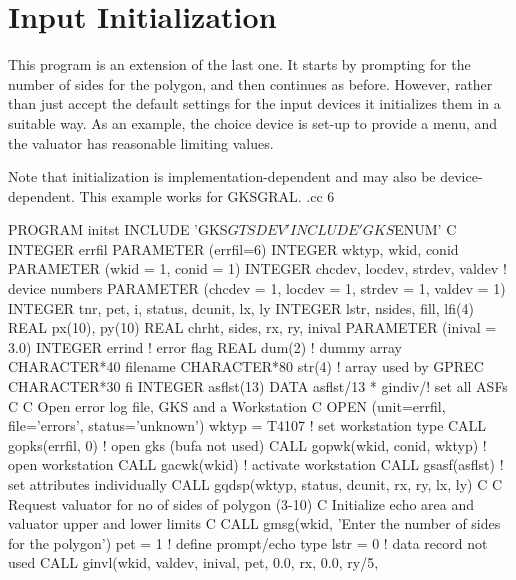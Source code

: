 \section{\protect\label{sec:iinput}Input Initialization}
 
This program is an extension of the last one.
It starts by prompting for the number of sides for the polygon,
and then continues as before. However, rather than just accept the default
settings for the input devices it initializes them in a suitable way.
As an example, the choice device is set-up to
provide a menu, and the valuator has reasonable limiting values.
 
Note that initialization is implementation-dependent and may also be
device-dependent. This example works for GKSGRAL.
.cc 6
\begin{XMP}
      PROGRAM initst
      INCLUDE  'GKS$GTSDEV'
      INCLUDE  'GKS$ENUM'
C
      INTEGER      errfil
      PARAMETER   (errfil=6)
      INTEGER      wktyp, wkid,  conid
      PARAMETER   (wkid = 1, conid = 1)
      INTEGER      chcdev, locdev, strdev, valdev  ! device numbers
      PARAMETER   (chcdev = 1, locdev = 1, strdev = 1, valdev = 1)
      INTEGER      tnr, pet, i, status, dcunit, lx, ly
      INTEGER      lstr, nsides, fill, lfi(4)
      REAL         px(10), py(10)
      REAL         chrht, sides, rx, ry, inival
      PARAMETER   (inival = 3.0)
      INTEGER      errind             ! error flag
      REAL         dum(2)             ! dummy array
      CHARACTER*40 filename
      CHARACTER*80 str(4)             ! array used by GPREC
      CHARACTER*30 fi
      INTEGER      asflst(13)
      DATA         asflst/13 * gindiv/! set all ASFs
C
C     Open error log file, GKS and a Workstation
C
      OPEN (unit=errfil, file='errors', status='unknown')
      wktyp = T4107                   ! set workstation type
      CALL gopks(errfil, 0)           ! open gks (bufa not used)
      CALL gopwk(wkid, conid, wktyp)  ! open workstation
      CALL gacwk(wkid)                ! activate workstation
      CALL gsasf(asflst)              ! set attributes individually
      CALL gqdsp(wktyp, status, dcunit, rx, ry, lx, ly)
C
C     Request valuator for no of sides of polygon (3-10)
C     Initialize echo area and valuator upper and lower limits
C
      CALL gmsg(wkid, 'Enter the number of sides for the polygon')
      pet = 1                         ! define prompt/echo type
      lstr = 0                        ! data record not used
      CALL ginvl(wkid, valdev, inival, pet, 0.0, rx, 0.0, ry/5,

\end{XMP}
